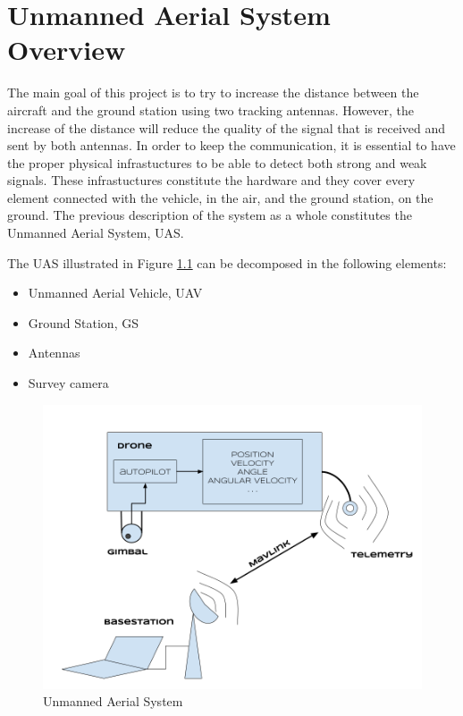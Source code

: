 \chapter{Unmanned Aerial System Overview}\label{ch:uas}

The main goal of this project is to try to increase the distance between the aircraft and the ground station using two tracking antennas. However, the increase of the distance will reduce the quality of the signal that is received and sent by both antennas. In order to keep the communication, it is essential to have the proper physical infrastuctures to be able to detect both strong and weak signals. These infrastuctures constitute the hardware and they cover every element connected with the vehicle, in the air, and the ground station, on the ground. The previous description of the system as a whole constitutes the Unmanned Aerial System, UAS.

The UAS illustrated in Figure \ref{fig:uas} can be decomposed in the following elements:
\begin{itemize}
	\item Unmanned Aerial Vehicle, UAV
	\item Ground Station, GS
	\item Antennas
	\item Survey camera
\end{itemize}

\begin{figure}[H]
	\centering
	\includegraphics[scale=0.33]{figures/uas.png}
	\caption{Unmanned Aerial System}
	\label{fig:uas}
\end{figure}

